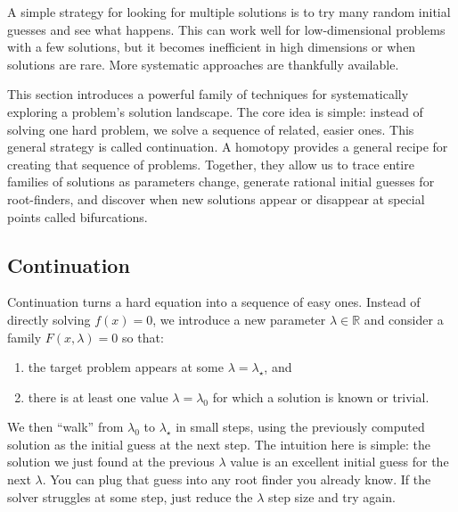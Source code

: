A simple strategy for looking for multiple solutions is to try many random initial guesses and see what happens. This can work well for low-dimensional problems with a few solutions, but it becomes inefficient in high dimensions or when solutions are rare. More systematic approaches are thankfully available.

This section introduces a powerful family of techniques for systematically exploring a problem's solution landscape. The core idea is simple: instead of solving one hard problem, we solve a sequence of related, easier ones. This general strategy is called continuation. A homotopy provides a general recipe for creating that sequence of problems. Together, they allow us to trace entire families of solutions as parameters change, generate rational initial guesses for root-finders, and discover when new solutions appear or disappear at special points called bifurcations.

\subsection{Continuation}

Continuation turns a hard equation into a sequence of easy ones. Instead of directly solving $f(x)=0$, we introduce a new parameter $\lambda \in \mathbb{R}$ and consider a family $F(x,\lambda)=0$ so that:

\begin{enumerate}
\item the target problem appears at some $\lambda=\lambda_\star$, and
\item there is at least one value $\lambda=\lambda_0$ for which a solution is known or trivial.
\end{enumerate}

We then ``walk'' from $\lambda_0$ to $\lambda_\star$ in small steps, using the previously computed solution as the initial guess at the next step. The intuition here is simple: the solution we just found at the previous $\lambda$ value is an excellent initial guess for the next $\lambda$. You can plug that guess into any root finder you already know. If the solver struggles at some step, just reduce the $\lambda$ step size and try again.

